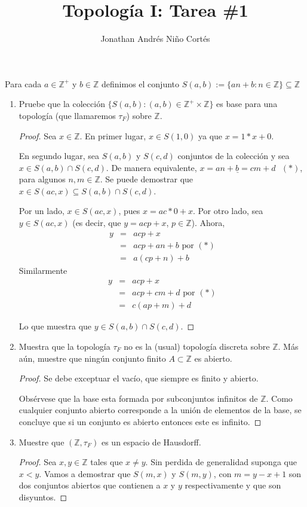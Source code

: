 \documentclass[letter,twoside,12pt]{article}
\title{Topolog\'ia I: Tarea \#1}
\author{Jonathan Andr\'es Ni\~no Cort\'es}
\begin{document}
\maketitle
Para cada $a \in \mathbb{Z}^+$ y $b \in \mathbb{Z}$ definimos el conjunto $S(a,b) :=\{an+b:n \in \mathbb{Z}\}\subseteq \mathbb{Z}$
\begin{enumerate}[label=\textbf{\arabic*}.]
\item Pruebe que la colecci\'on $\{S(a,b):(a,b) \in \mathbb{Z^+ \times \mathbb{Z}}\}$ es base para una topolog\'ia (que llamaremos $\tau_F$) sobre $\mathbb{Z}$.
\begin{proof}
Sea $x \in \mathbb{Z}$. En primer lugar, $x \in S(1,0)$ ya que $x=1*x+0$.

En segundo lugar, sea $S(a,b)$ y $S(c,d)$ conjuntos de la colecci\'on y sea $x \in S(a,b) \cap S(c,d)$. De manera equivalente, $\underline{x=an+b=cm+d}\text{ }(*)$, para algunos $n,m \in  \mathbb{Z}$.
Se puede demostrar que $x \in S(ac,x) \subseteq S(a,b) \cap S(c,d)$.

Por un lado, $x \in S(ac,x)$, pues $x=ac*0+x$. Por otro lado, sea $y \in S(ac,x)$ (es decir, que $y=acp+x$, $p \in \mathbb{Z}$). Ahora,
\begin{eqnarray}
y&=&acp+x \nonumber
\\ &=&acp+an+b \text{ por  }(*)\nonumber
\\ &=&a(cp+n)+b\nonumber
\end{eqnarray}
Similarmente
\begin{eqnarray}
y&=&acp+x \nonumber
\\ &=&acp+cm+d \text{ por }(*)\nonumber
\\ &=&c(ap+m)+d\nonumber
\end{eqnarray}

Lo que muestra que $y \in S(a,b) \cap S(c,d)$.
\end{proof}
\item Muestra que la topolog\'ia $\tau_F$ no es la (usual) topolog\'ia discreta sobre $\mathbb{Z}$. M\'as a\'un, muestre que ning\'un conjunto finito $A \subset \mathbb{Z}$ es abierto.

\begin{proof}
Se debe exceptuar el vac\'io, que siempre es finito y abierto.

Obs\'ervese que la base esta formada por subconjuntos infinitos de $\mathbb{Z}$. Como cualquier conjunto abierto corresponde a la uni\'on de elementos de la base, se concluye que si un conjunto es abierto entonces este es infinito. 
\end{proof}
\item Muestre que $(\mathbb{Z}, \tau_{F})$ es un espacio de Hausdorff. 
\begin{proof}
Sea $x,y \in \mathbb{Z}$ tales que $x \not = y$. Sin perdida de generalidad suponga que $x < y$. Vamos a demostrar que $S(m,x)$ y $S(m,y)$, con $m =y-x+1$ son dos conjuntos abiertos que contienen a $x$ y $y$ respectivamente y que son disyuntos.


\end{proof}
\end{enumerate}
\end{document}
